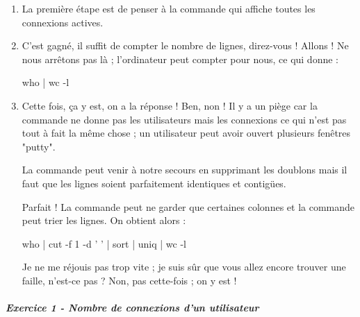 \documentclass[11pt,a4paper]{article}
\begin{document}
					\begin{enumerate}
				
			\item 
						La premi\`ere \'etape est de penser
						\`a la commande 
						\verb@who@
						qui affiche toutes les connexions actives.
					
			\item 
						C'est gagn\'e, il suffit de compter
						le nombre de lignes, direz-vous !
						Allons ! Ne nous arr\^etons pas l\`a ;
						l'ordinateur peut compter pour nous,
						ce qui donne :
						\begin{Java}
	who | wc -l
						\end{Java}
			\item 
							Cette fois, \c ca y est, on a la r\'eponse !
							Ben, non !
							Il y a un pi\`ege 
							car la commande
							\verb@who@
							ne donne pas les utilisateurs
							mais les connexions
							ce qui n'est pas tout \`a fait
							la m\^eme chose ;
							un utilisateur peut avoir
							ouvert plusieurs fen\^etres "putty". 
						
            \par
        
							La commande 
							\verb@uniq@
							peut venir \`a notre secours en supprimant
							les doublons mais il faut que les
							lignes soient parfaitement identiques
							et contig\"ues.
						
            \par
        
							Parfait !
							La commande
							\verb@cut@
							peut ne garder que certaines colonnes
							et la commande
							\verb@sort@
							peut trier les lignes.
							On obtient alors :							
						
            \par
        \begin{Java}
	who | cut -f 1 -d ' ' | sort | uniq | wc -l
						\end{Java}
							Je ne me r\'ejouis pas trop vite ;
							je suis s\^ur que vous allez encore
							trouver une faille, n'est-ce pas ?
							Non, pas cette-fois ; on y est !
						
            \par
        
					\end{enumerate}
				
			
		\subparagraph{Exercice 1 - Nombre de connexions d'un utilisateur} 
		
\end{document}
